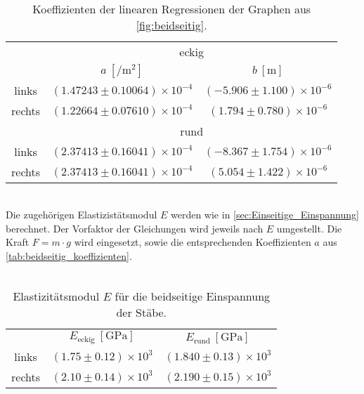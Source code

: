 \\
\begin{table}[h!]
    \centering
    \caption{Koeffizienten der linearen Regressionen der Graphen aus \autoref{fig:beidseitig}.}
    \label{tab:beidseitig_koeffizienten}
    \begin{tabular}{c|c c|}
        \toprule
        & \multicolumn{2}{c}{eckig}\\
        \cmidrule(lr){2-3}
        & $a \:[\unit{\per\meter\squared}]$ & $b \:[\unit{\meter}]$\\%
        \midrule
        links & $(1.47243 \pm 0.10064)\times 10^{-4}$ & $(-5.906 \pm 1.100)\times 10^{-6}$\\%
        rechts & $(1.22664 \pm 0.07610)\times 10^{-4}$ & $(1.794 \pm 0.780)\times 10^{-6}$\\%
        \midrule
        &\multicolumn{2}{c}{rund}\\ 
        \cmidrule(lr){2-3}
        links & $(2.37413 \pm 0.16041)\times 10^{-4}$ & $(-8.367 \pm 1.754)\times 10^{-6}$ \\
        rechts & $(2.37413 \pm 0.16041)\times 10^{-4}$ & $(5.054 \pm 1.422)\times 10^{-6}$ \\
        \bottomrule
    \end{tabular}
\end{table}
\\

Die zugehörigen Elastizistätsmodul $E$ werden wie in \autoref{sec:Einseitige_Einspannung} berechnet. Der Vorfaktor der Gleichungen %
wird jeweils nach $E$ umgestellt. Die Kraft $F = m \cdot g$ wird eingesetzt, sowie die entsprechenden Koeffizienten $a$ aus \autoref{tab:beidseitig_koeffizienten}.\\
\\
\begin{table}
    \centering
    \caption{Elastizitätsmodul $E$ für die beidseitige Einspannung der Stäbe.}
    \label{tab:beidseitig_E}
    \begin{tabular}{c|c c|}
        \toprule
        & $E_{\text{eckig}}\:[\unit{\giga\pascal}]$ & $E_{\text{rund}}\:[\unit{\giga\pascal}]$\\
        \cmidrule(lr){2-3}
        links & $(1.75 \pm 0.12)\times 10^3$ & $(1.840 \pm 0.13)\times 10^3$\\
        rechts & $(2.10 \pm 0.14)\times 10^3$ & $(2.190 \pm 0.15)\times 10^3$\\
        \bottomrule
    \end{tabular}
\end{table}
